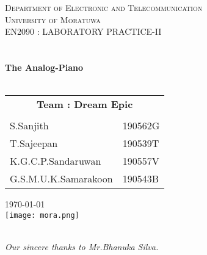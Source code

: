 
\begin{titlepage}

    \center

    \textsc{\Large Department of Electronic and Telecommunication}\\[.4cm]
    \textsc{\Large University of Moratuwa}\\[1cm]

    \textsc{\Large EN2090 : LABORATORY PRACTICE-II}\\[0.2cm]
    \textsc{\large }\\[1cm] 										%
    \HRule \\[0.5cm]
    { \LARGE \bfseries The Analog-Piano}\\[0.3cm]
    \HRule \\[1.5cm]
    \large
    \begin{center}
        \begin{tabular}{l l}
            \multicolumn{2}{c}{\textbf{Team : Dream Epic}} \\\\
            S.Sanjith  & 190562G \\
            T.Sajeepan & 190539T \\
            K.G.C.P.Sandaruwan  & 190557V \\
            G.S.M.U.K.Samarakoon & 190543B \\
        \end{tabular}
    \end{center}
\vspace*{1cm}
    {\Large \today}\\[1cm]
    \texttt{[image: mora.png]}\\[2cm] 
    \HRule\\
    \begin{flushleft}
        \vspace*{-.4cm}
        \emph{Our sincere thanks to Mr.Bhanuka Silva.}
    \end{flushleft}
    \vfill
\end{titlepage}



